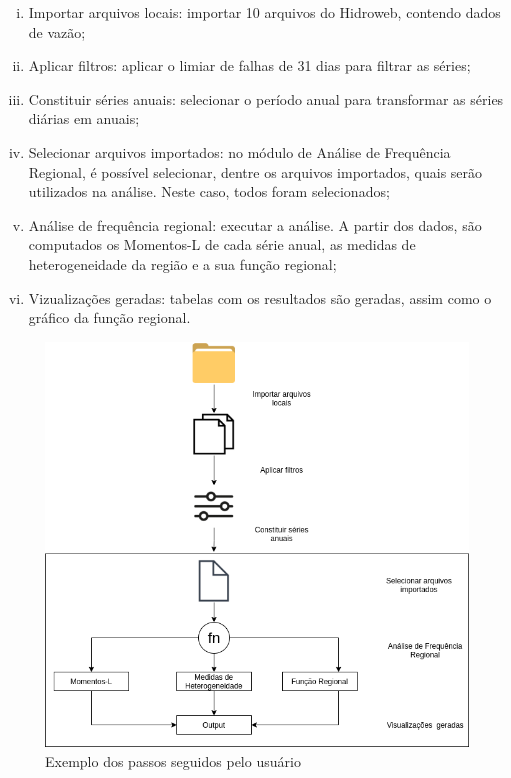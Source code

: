 \documentclass[12pt,english,brazil]{article}
\begin{document}
\begin{enumerate}[i.]
  \item Importar arquivos locais: importar 10 arquivos do Hidroweb, contendo dados de vazão;
  \item Aplicar filtros: aplicar o limiar de falhas de 31 dias para filtrar as séries;
  \item Constituir séries anuais: selecionar o período anual para transformar as séries diárias em anuais;
  \item Selecionar arquivos importados: no módulo de Análise de Frequência Regional, é possível selecionar, dentre os arquivos importados, quais serão utilizados na análise. Neste caso, todos foram selecionados;
  \item Análise de frequência regional: executar a análise. A partir dos dados, são computados os Momentos-L de cada série anual, as medidas de heterogeneidade da região e a sua função regional;
  \item Vizualizações geradas: tabelas com os resultados são geradas, assim como o gráfico da função regional.
\end{enumerate}



\begin{figure}[htbp]
  \centering 
  \includegraphics[scale=.4]{paperWSCAD2021/figures/useWebSYHDADrawio.png}
  \caption{Exemplo dos passos seguidos pelo usuário}
  \label{usoWebSYHDA}
\end{figure}
\end{document}
